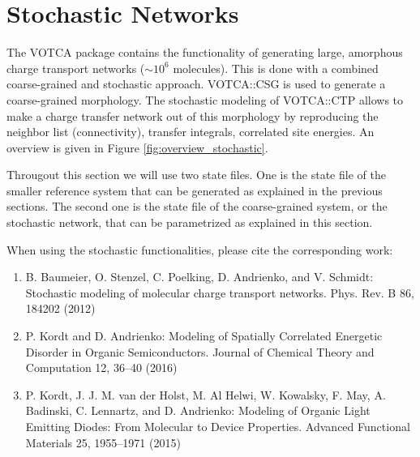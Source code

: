 \section{Stochastic Networks}
\label{sec:stochastic}

The VOTCA package contains the functionality of generating large, amorphous charge transport networks ($\sim10^6$ molecules). This is done with a combined coarse-grained and stochastic approach. VOTCA::CSG is used to generate a coarse-grained morphology. The stochastic modeling of VOTCA::CTP allows to make a charge transfer network out of this morphology by reproducing the neighbor list (connectivity), transfer integrals, correlated site energies. An overview is given in Figure \ref{fig:overview_stochastic}.

Througout this section we will use two state files. One is the state file \sqlstateref of the smaller reference system that can be generated as explained in the previous sections. The second one is the state file \sqlstatecg of the coarse-grained system, or the stochastic network, that can be parametrized as explained in this section.


When using the stochastic functionalities, please cite the corresponding work:

\begin{enumerate}
\item{B. Baumeier, O. Stenzel, C. Poelking, D. Andrienko, and V. Schmidt: Stochastic modeling of molecular charge transport networks. Phys. Rev. B 86, 184202 (2012)}
\item{P. Kordt and D. Andrienko: Modeling of Spatially Correlated Energetic Disorder in Organic Semiconductors. Journal of Chemical Theory and Computation 12, 36--40 (2016)}
\item{P. Kordt, J. J. M. van der Holst, M. Al Helwi, W. Kowalsky, F. May, A. Badinski, C. Lennartz, and D. Andrienko: Modeling of Organic Light Emitting Diodes: From Molecular to Device Properties. Advanced Functional Materials 25, 1955--1971 (2015)}
\end{enumerate}




